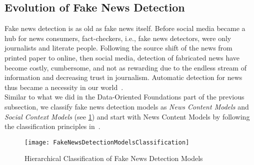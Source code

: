 \subsection{Evolution of Fake News Detection}
\label{subsec:fakeNewsDetection_Evolution}
Fake news detection is as old as fake news itself. Before social media became a hub for news consumers, fact-checkers, i.e., fake news
detectors, were only journalists and literate people. Following the source shift of the news from printed paper to online, then social
media, detection of fabricated news have become costly, cumbersome, and not as rewarding due to the endless stream of information and
decreasing trust in journalism. Automatic detection for news thus became a necessity in our world~\parencite{NewsInAnOnlineWorld_Chen}.\\
Similar to what we did in the Data-Oriented Foundations part of the previous subsection, we classify fake news detection models as
\emph{News Content Models} and  \emph{Social Context Models} (see \ref{fig:FakeNewsDetectionModelsClassification}) and start with News Content Models by following the classification principles in~\parencite{FakeNewsDetectionOnSocialMediaADataMiningPerspective_Shu}.\\
\begin{figure}
    \centering
    \texttt{[image: FakeNewsDetectionModelsClassification]}
    \caption[Hierarchical Classification of Fake News Detection Models]{Hierarchical Classification of Fake News Detection Models}
    \label{fig:FakeNewsDetectionModelsClassification}
\end{figure}

